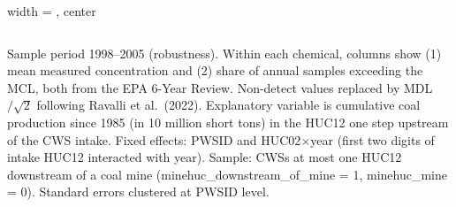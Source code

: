 \begin{table}[htbp]
\begin{adjustbox}{width = \textwidth, center}
\begin{tabular}{lccccc}
         \bottomrule
         
      \end{tabular}
      
      
      
   \end{adjustbox}
      {\tiny\linespread{1}\selectfont \par \raggedright 
   Sample period 1998--2005 (robustness). Within each chemical, columns show (1) mean measured concentration and (2) share of annual samples exceeding the MCL, both from the EPA 6-Year Review. Non-detect values replaced by MDL$/\sqrt{2}$ following Ravalli et al.~(2022). Explanatory variable is cumulative coal production since 1985 (in 10 million short tons) in the HUC12 one step upstream of the CWS intake. Fixed effects: PWSID and HUC02$\times$year (first two digits of intake HUC12 interacted with year). Sample: CWSs at most one HUC12 downstream of a coal mine (minehuc\_downstream\_of\_mine = 1, minehuc\_mine = 0). Standard errors clustered at PWSID level.}
   
\end{table}


